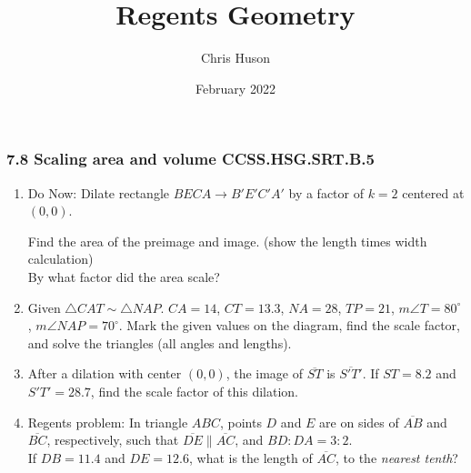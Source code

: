 \documentclass[12pt, twoside]{article}
\title{Regents Geometry}
\author{Chris Huson}
\date{February 2022}
\begin{document}
\subsubsection*{7.8 Scaling area and volume \hfill CCSS.HSG.SRT.B.5}
\begin{enumerate}
  \item Do Now: Dilate rectangle $BECA \rightarrow B'E'C'A'$ by a factor of $k=2$ centered at $(0,0)$.
  \begin{multicols}{2}

    Find the area of the preimage and image. (show the length times width calculation)\\[5cm]
    By what factor did the area scale?
  \end{multicols}

\item Given $\triangle CAT \sim \triangle NAP$. $CA=14$, $CT=13.3$, $NA=28$, $TP=21$, $m\angle T=80^\circ$, $m\angle NAP = 70^\circ$. Mark the given values on the diagram, find the scale factor, and solve the triangles (all angles and lengths).
  \begin{flushright}
  \end{flushright}

\newpage
\item After a dilation with center $(0,0)$, the image of $\overline{ST}$ is $\overline{S'T'}$. If $ST=8.2$ and $S'T'=28.7$, find the scale factor of this dilation. \vspace{2cm}

\item Regents problem: In triangle $ABC$, points $D$ and $E$ are on sides of $\overline{AB}$ and $\overline{BC}$, respectively, such that $\overline{DE} \parallel \overline{AC}$, and $BD:DA = 3:2$.\\[0.5cm]
If $DB=11.4$ and $DE=12.6$, what is the length of $\overline{AC}$, to the \emph{nearest tenth}?
\begin{flushright}
\end{flushright}



\end{enumerate}
\end{document}

